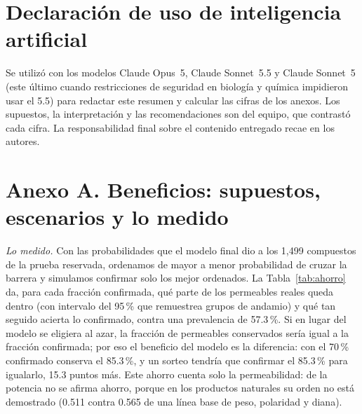 \documentclass[letterpaper,11pt]{article}
\begin{document}
\section*{Declaración de uso de inteligencia artificial}
Se utilizó \textcite{anthropic2026claude} con los modelos Claude Opus~5, Claude Sonnet~5.5 y Claude Sonnet~5 (este último cuando restricciones de seguridad en biología y química impidieron usar el 5.5) para redactar este resumen y calcular las cifras de los anexos. Los supuestos, la interpretación y las recomendaciones son del equipo, que contrastó cada cifra. La responsabilidad final sobre el contenido entregado recae en los autores.

\printbibliography[title={Referencias},notkeyword=anexo]

\clearpage
\section*{Anexo A. Beneficios: supuestos, escenarios y lo medido}
\noindent\textit{Lo medido.} Con las probabilidades que el modelo final dio a los 1,499 compuestos de la prueba reservada, ordenamos de mayor a menor probabilidad de cruzar la barrera y simulamos confirmar solo los mejor ordenados. La Tabla~\ref{tab:ahorro} da, para cada fracción confirmada, qué parte de los permeables reales queda dentro (con intervalo del 95\,\% que remuestrea grupos de andamio) y qué tan seguido acierta lo confirmado, contra una prevalencia de 57.3\,\%. Si en lugar del modelo se eligiera al azar, la fracción de permeables conservados sería igual a la fracción confirmada; por eso el beneficio del modelo es la diferencia: con el 70\,\% confirmado conserva el 85.3\,\%, y un sorteo tendría que confirmar el 85.3\,\% para igualarlo, 15.3 puntos más. Este ahorro cuenta solo la permeabilidad: de la potencia no se afirma ahorro, porque en los productos naturales su orden no está demostrado (0.511 contra 0.565 de una línea base de peso, polaridad y diana).
\end{document}
